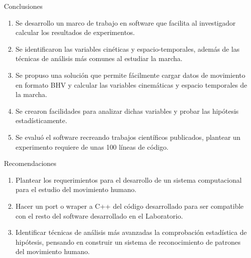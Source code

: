 \documentclass{beamer} %
\begin{document}
\begin{frame}{Conclusiones}
    \begin{enumerate}
        \item Se desarrollo un marco de trabajo en software que facilita al investigador calcular los resultados de experimentos. 
        \item Se identificaron las variables cinéticas y espacio-temporales, además de las técnicas de análisis más comunes al estudiar la marcha. 
        \item Se propuso una solución que permite fácilmente cargar datos de movimiento en formato BHV y calcular las variables cinemáticas y espacio temporales de la marcha.
        \item Se crearon facilidades para analizar dichas variables y probar las hipótesis estadísticamente. 
        \item Se evaluó el software recreando trabajos científicos publicados, plantear un experimento requiere de unas 100 líneas de código.
    \end{enumerate}
\end{frame}

\begin{frame}{Recomendaciones}
    \begin{enumerate}
        \item Plantear los requerimientos para el desarrollo de un sistema computacional para el estudio del movimiento humano. 
        \item Hacer un port o wraper a C++ del código desarrollado para ser compatible con el resto del software desarrollado en el Laboratorio. 
        \item Identificar técnicas de análisis más avanzadas la comprobación estadística de hipótesis, pensando en construir un sistema de reconocimiento de patrones del movimiento humano. 
    \end{enumerate}
\end{frame}




\end{document}
